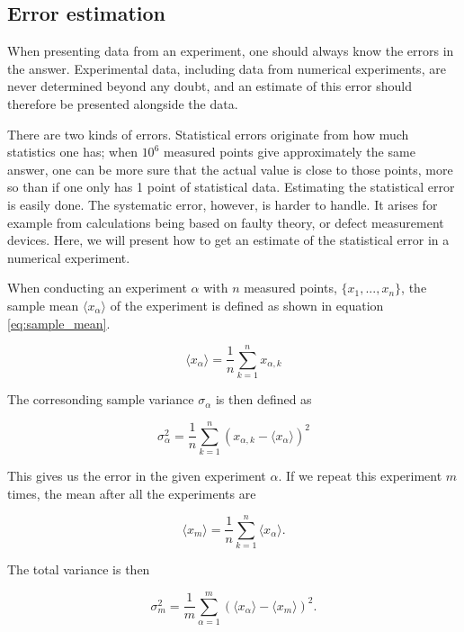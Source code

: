 \documentclass[norsk,a4paper,12pt]{article}
\begin{document}
\subsection{Error estimation} \label{Error_estimation}
When presenting data from an experiment, one should always know the errors in the answer. Experimental data, including data from numerical experiments, are never determined beyond any doubt, and an estimate of this error should therefore be presented alongside the data. \par
There are two kinds of errors. Statistical errors originate from how much statistics one has; when $10^6$ measured points give approximately the same answer, one can be more sure that the actual value is close to those points, more so than if one only has 1 point of statistical data. Estimating the statistical error is easily done. The systematic error, however, is harder to handle. It arises for example from calculations being based on faulty theory, or defect measurement devices. Here, we will present how to get an estimate of the statistical error in a numerical experiment.
\par 
\vspace{3mm}
When conducting an experiment $\alpha$ with $n$ measured points, $ \{x_1, ..., x_n \}$, the sample mean $ \langle x_{\alpha} \rangle$ of the experiment  is defined as shown in equation \ref{eq:sample_mean}.

\begin{equation}
\label{eq:sample_mean}
\langle x_{\alpha} \rangle = \frac{1}{n} \sum_{k=1}^n x_{\alpha,k}
\end{equation}

The corresonding sample variance $\sigma_{\alpha}$ is then defined as

\begin{equation}
\sigma_{\alpha}^2 = \frac{1}{n} \sum_{k=1}^n (x_{\alpha,k} - \langle x_{\alpha} \rangle )^2
\end{equation}

This gives us the error in the given experiment $\alpha$. If we repeat this experiment $m$ times, the mean after all the experiments are

\begin{equation}
\label{eq:mean}
\langle x_{m} \rangle = \frac{1}{n} \sum_{k=1}^n  \langle x_{\alpha} \rangle.
\end{equation}

The total variance is then

\begin{equation}
\sigma_m^2 = \frac{1}{m} \sum_{\alpha=1}^m ( \langle x_{\alpha} \rangle - \langle x_{m} \rangle )^2.
\end{equation}
\end{document}
